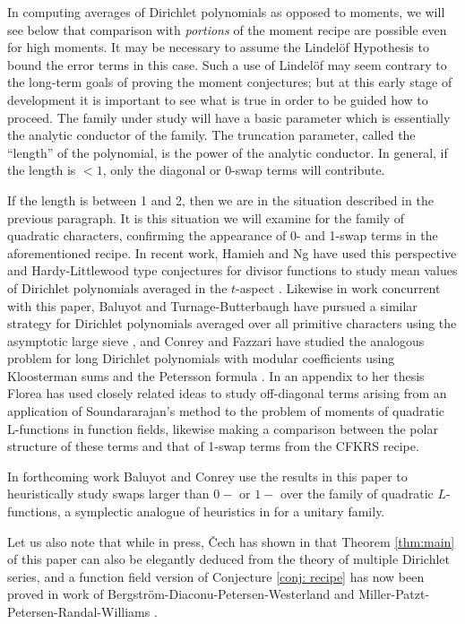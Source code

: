 \documentclass[12pt]{amsart}
\begin{document}
	In computing averages of Dirichlet polynomials as opposed to moments, we will see below that comparison with \emph{portions} of the moment recipe are possible even for high moments. It may be necessary to assume the Lindel\"{o}f Hypothesis to bound 
	the error terms in this case. Such a  use of Lindel\"{o}f may seem contrary to the long-term goals of proving the moment conjectures; but at this early stage of development it is important to see what is true in order to be guided how to proceed. 
	The family under study will have a basic parameter which is essentially the analytic conductor of the family. The truncation parameter,  called the ``length'' of the polynomial, is the power of the analytic conductor.  In general, if the length is $<1$, only the diagonal or 0-swap terms will contribute.
	
	If the length is  between 1 and 2, then we are in the situation described in the previous paragraph. It is this situation we will examine for the family of quadratic characters, confirming the appearance of 0- and 1-swap terms in the aforementioned recipe. In recent work, Hamieh and Ng have used this perspective and Hardy-Littlewood type conjectures for divisor functions to study mean values of Dirichlet polynomials averaged in the $t$-aspect \cite{HaNg}. Likewise in work concurrent with this paper, Baluyot and Turnage-Butterbaugh have pursued a similar strategy for Dirichlet polynomials averaged over all primitive characters using the asymptotic large sieve \cite{BaTu}, and Conrey and Fazzari have studied the analogous problem for long Dirichlet polynomials with modular coefficients using Kloosterman sums and the Petersson formula \cite{CoFaz}. In an appendix to her thesis \cite{Flo1} Florea has used closely related ideas to study off-diagonal terms arising from an application of Soundararajan's method to the problem of moments of quadratic L-functions in function fields, likewise making a comparison between the polar structure of these terms and that of 1-swap terms from the CFKRS recipe.
	
	In forthcoming work Baluyot and Conrey use the results in this paper to heuristically study swaps larger than $0-$ or $1-$ over the family of quadratic $L$-functions, a symplectic analogue of heuristics in \cite{BaCo,CoKeI, CoKeII, CoKeIII, CoKeIV, CoKeV} for a unitary family.
	
	Let us also note that while in press, \v{C}ech has shown in \cite{Ce} that Theorem \ref{thm:main} of this paper can also be elegantly deduced from the theory of multiple Dirichlet series, and a function field version of Conjecture \ref{conj: recipe} has now been proved in work of Bergström-Diaconu-Petersen-Westerland and Miller-Patzt-Petersen-Randal-Williams \cite{BeDiPeWe, MiPaPeRaWi}. 
	
\end{document}
